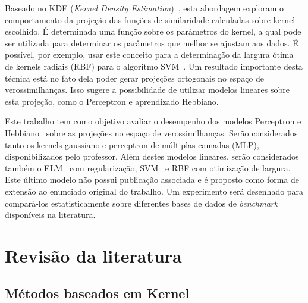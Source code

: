 \documentclass[conference]{IEEEtran}
\begin{document}
	Baseado no KDE (\textit{Kernel Density Estimation})~\cite{wang2013gaussian}, esta abordagem exploram o comportamento da projeção das funções de similaridade calculadas sobre kernel escolhido. É determinada uma função sobre os parâmetros do kernel, a qual pode ser utilizada para determinar os parâmetros que melhor se ajustam aos dados. É possível, por exemplo, usar este conceito para a determinação da largura ótima de kernels radiais (RBF) para o algoritmo SVM~\cite{menezes2019width}. Um resultado importante desta técnica está no fato dela poder gerar projeções ortogonais no espaço de verossimilhanças. Isso sugere a possibilidade de utilizar modelos lineares sobre esta projeção, como o Perceptron e aprendizado Hebbiano.
	
	Este trabalho tem como objetivo avaliar o desempenho dos modelos Perceptron e Hebbiano~\cite{fernandez2011direct} sobre as projeções no espaço de verossimilhanças. Serão considerados tanto os kernels gaussiano e perceptron de múltiplas camadas (MLP), disponibilizados pelo professor. Além destes modelos lineares, serão considerados também o ELM~\cite{huang2004extreme} com regularização, SVM~\cite{menezes2017otimizaccao, menezes2019width} e RBF com otimização de largura. Este último modelo não possui publicação associada e é proposto como forma de extensão ao enunciado original do trabalho. 
	Um experimento será desenhado para compará-los estatisticamente sobre diferentes bases de dados de \textit{benchmark} disponíveis na literatura. 
	

	\section{Revisão da literatura}

	\subsection{Métodos baseados em Kernel}
	
	
	
\end{document}
